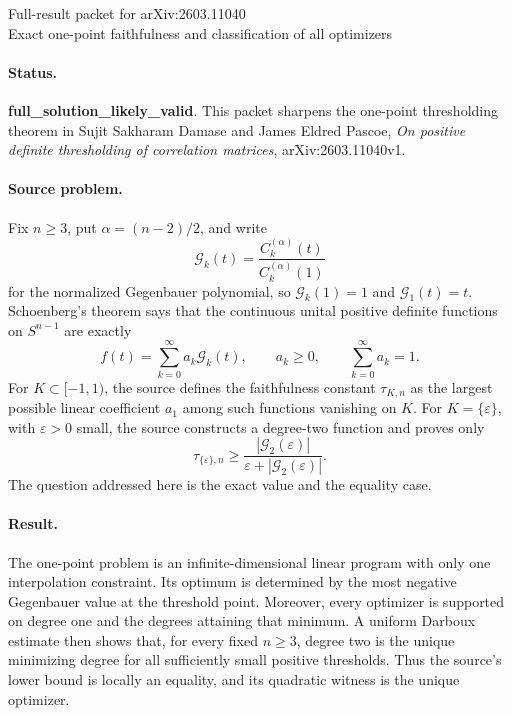 \documentclass[11pt]{article}
\newcommand{\G}{\mathcal G}
\begin{document}
\begin{center}
{\Large Full-result packet for arXiv:2603.11040}\\[4pt]
{\large Exact one-point faithfulness and classification of all optimizers}
\end{center}

\paragraph{Status.}
\textbf{full\_solution\_likely\_valid}.  This packet sharpens the one-point
thresholding theorem in Sujit Sakharam Damase and James Eldred Pascoe,
\emph{On positive definite thresholding of correlation matrices},
arXiv:2603.11040v1.

\paragraph{Source problem.}
Fix \(n\geq3\), put \(\alpha=(n-2)/2\), and write
\[
  \G_k(t)=\frac{C_k^{(\alpha)}(t)}{C_k^{(\alpha)}(1)}
\]
for the normalized Gegenbauer polynomial, so \(\G_k(1)=1\) and
\(\G_1(t)=t\).  Schoenberg's theorem says that the continuous unital
positive definite functions on \(S^{n-1}\) are exactly
\[
  f(t)=\sum_{k=0}^{\infty}a_k\G_k(t),
  \qquad a_k\geq0,\qquad \sum_{k=0}^{\infty}a_k=1.
\]
For \(K\subset[-1,1)\), the source defines the faithfulness constant
\(\tau_{K,n}\) as the largest possible linear coefficient \(a_1\) among
such functions vanishing on \(K\).  For \(K=\{\varepsilon\}\), with
\(\varepsilon>0\) small, the source constructs a degree-two function and
proves only
\[
 \tau_{\{\varepsilon\},n}\geq
 \frac{|\G_2(\varepsilon)|}
      {\varepsilon+|\G_2(\varepsilon)|}.
\]
The question addressed here is the exact value and the equality case.

\paragraph{Result.}
The one-point problem is an infinite-dimensional linear program with only
one interpolation constraint.  Its optimum is determined by the most
negative Gegenbauer value at the threshold point.  Moreover, every optimizer
is supported on degree one and the degrees attaining that minimum.  A
uniform Darboux estimate then shows that, for every fixed \(n\geq3\), degree
two is the unique minimizing degree for all sufficiently small positive
thresholds.  Thus the source's lower bound is locally an equality, and its
quadratic witness is the unique optimizer.
\end{document}
